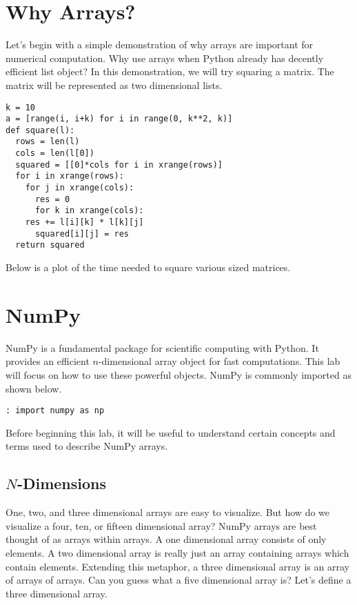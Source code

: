 \label{lab:Essentials_NumPy}

\section*{Why Arrays?}
Let's begin with a simple demonstration of why arrays are important for numerical computation.  Why use arrays when Python already has decently efficient list object?  In this demonstration, we will try squaring a matrix.  The matrix will be represented as two dimensional lists.

\begin{lstlisting}
k = 10
a = [range(i, i+k) for i in range(0, k**2, k)]
def square(l):
  rows = len(l)
  cols = len(l[0])
  squared = [[0]*cols for i in xrange(rows)]
  for i in xrange(rows):
    for j in xrange(cols):
      res = 0
      for k in xrange(cols):
	res += l[i][k] * l[k][j]
      squared[i][j] = res
  return squared
\end{lstlisting}
Below is a plot of the time needed to square various sized matrices.


\section*{NumPy}
NumPy is a fundamental package for scientific computing with Python.  It provides an efficient $n$-dimensional array object for fast computations.  This lab will focus on how to use these powerful objects.  NumPy is commonly imported as shown below.

\begin{lstlisting}
: import numpy as np
\end{lstlisting}
Before beginning this lab, it will be useful to understand certain concepts and terms used to describe NumPy arrays.

\subsection*{$N$-Dimensions}
One, two, and three dimensional arrays are easy to visualize.  But how do we visualize a four, ten, or fifteen dimensional array?  NumPy arrays are best thought of as arrays within arrays.  A one dimensional array consists of only elements.  A two dimensional array is really just an array containing arrays which contain elements.  Extending this metaphor, a three dimensional array is an array of arrays of arrays.  Can you guess what a five dimensional array is?  Let's define a three dimensional array.

